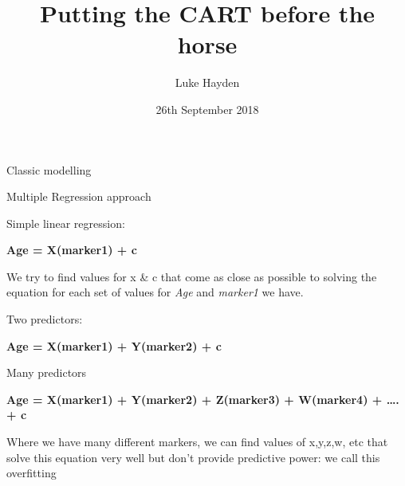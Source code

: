 \documentclass[ignorenonframetext,]{beamer}
\title{Putting the CART before the horse}
\author{Luke Hayden}
\date{26th September 2018}
\begin{document}
\frame{\titlepage}

\begin{frame}{Classic modelling}

\begin{block}{Multiple Regression approach}

\begin{block}{Simple linear regression:}

\textbf{Age = X(marker1) + c}

We try to find values for x \& c that come as close as possible to
solving the equation for each set of values for \emph{Age} and
\emph{marker1} we have.

\end{block}

\begin{block}{Two predictors:}

\textbf{Age = X(marker1) + Y(marker2) + c}

\end{block}

\begin{block}{Many predictors}

\textbf{Age = X(marker1) + Y(marker2) + Z(marker3) + W(marker4) +
\ldots{}. + c}

Where we have many different markers, we can find values of x,y,z,w, etc
that solve this equation very well but don't provide predictive power:
we call this overfitting

\end{block}

\end{block}

\end{frame}
\end{document}
